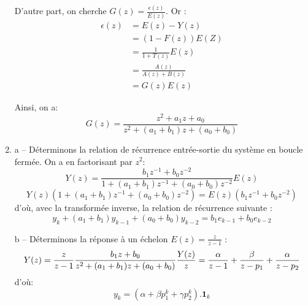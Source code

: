 \documentclass[../main.tex]{subfiles}
\begin{document}
\begin{enumerate}
D'autre part, on cherche $G(z) = \frac{\epsilon (z)}{E(z)}$. Or :
\begin{align*}
\epsilon (z) &= E(z) - Y(z)\\
&= (1-F(z))E(Z)\\
&=\frac{1}{1+T(z)}E(z)\\
&=\frac{A(z)}{A(z)+B(z)}\\
&=G(z) E(z)
\end{align*}

Ainsi, on a: \[G(z)=\frac{z^2 +a_1z+a_0}{z^2+(a_1+b_1)z+(a_0+b_0)}\]

\item a -- Déterminons la relation de récurrence entrée-sortie du système en boucle fermée. On a en factorisant par $z^2$:
\[Y(z)=\frac{b_1z^{-1}+b_0z^{-2}}{1+(a_1+b_1)z^{-1}+(a_0+b_0)z^{-2}}E(z)\]
\[Y(z)(1+(a_1+b_1)z^{-1}+(a_0+b_0)z^{-2}) = E(z)(b_1z^{-1}+b_0z^{-2}) \]
d'où, avec la transformée inverse, la relation de récurrence suivante :
\[y_k+(a_1+b_1)y_{k-1}+(a_0+b_0)y_{k-2}=b_1e_{k-1}+b_0e_{k-2}\]

\noindent b -- Déterminons la réponse à un échelon $E(z) = \frac{z}{z-1}$ :
\[Y(z) = \frac{z}{z-1}\frac{b_1z+b_0}{z^2+(a_1+b_1)z+(a_0+b_0)}\\
\frac{Y(z)}{z}=\frac{\alpha}{z-1}+\frac{\beta}{z-p_1}+\frac{\alpha}{z-p_2}\]
d'où:
\[y_k = (\alpha+\beta p_1^k+\gamma p_2^k).\mathbf{1}_k\]
\end{enumerate}
\end{document}
